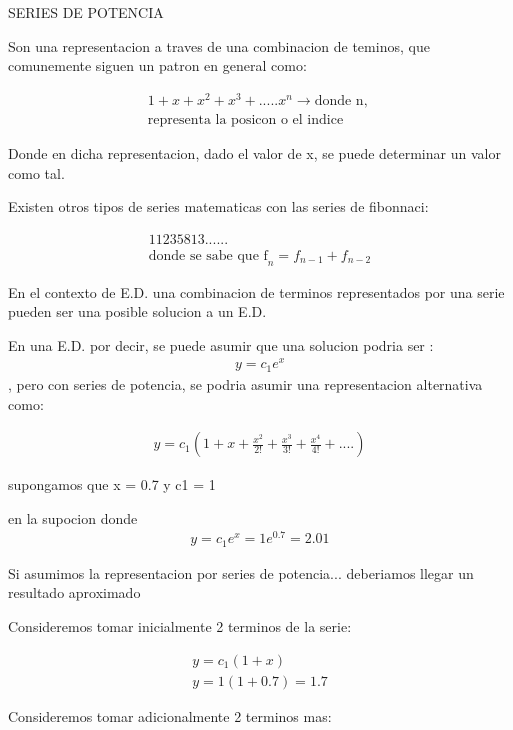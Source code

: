 \documentclass{article}
\begin{document}
SERIES DE POTENCIA

Son una representacion a traves de una combinacion de teminos, que comunemente siguen un patron en general como:




\begin{gather*}
1+x+x^{2}+x^{3}+.....x^{n}   \rightarrow \text{donde n, } \\
\text{representa la posicon o el indice}
\end{gather*}


Donde en dicha representacion, dado el valor de x, se puede determinar un valor como tal.

Existen otros tipos de series matematicas con las series de fibonnaci:




\begin{gather*}
1 1 2  3  5  8  13  ...... \\
\text{donde se sabe que f}_{n} = f_{n-1}+f_{n-2}
\end{gather*}


En el contexto de E.D. una combinacion de terminos representados por una serie pueden ser una posible solucion a un E.D.

En una E.D. por decir, se puede asumir que una solucion podria ser : 
\begin{gather*}
y=c_{1}e^{x}
\end{gather*}
, pero con series de potencia, se podria asumir una representacion alternativa como:




\begin{gather*}
y =c_{1}(1+x + \frac{x^{2}}{2!}+\frac{x^{3}}{3!}+\frac{x^{4}}{4!}+....)
\end{gather*}


supongamos que x = 0.7 y c1 = 1

en la supocion donde 
\begin{gather*}
y=c_{1}e^{x}= 1e^{0.7}=2.01 
\end{gather*}


Si asumimos la representacion por series de potencia... deberiamos llegar un resultado aproximado

Consideremos tomar inicialmente 2 terminos de la serie: 


\begin{gather*}
y =c_{1}(1+x) \\
y = 1(1+0.7)= 1.7
\end{gather*}


Consideremos tomar adicionalmente 2 terminos mas:
\end{document}
